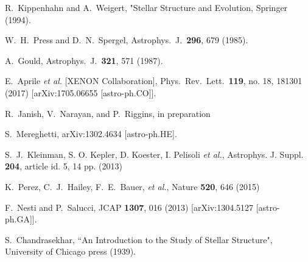 R.~Kippenhahn and A.~Weigert, "Stellar Structure and Evolution, Springer (1994).

  W.~H.~Press and D.~N.~Spergel,
  Astrophys.\ J.\  {\bf 296}, 679 (1985).


  A.~Gould,
  Astrophys.\ J.\  {\bf 321}, 571 (1987).


  E.~Aprile {\it et al.} [XENON Collaboration],
  Phys.\ Rev.\ Lett.\  {\bf 119}, no. 18, 181301 (2017)
  [arXiv:1705.06655 [astro-ph.CO]].

R.~Janish, V.~Narayan, and P.~Riggins, in preparation

  S.~Mereghetti,
  arXiv:1302.4634 [astro-ph.HE].


S.~J.~Kleinman, S. O. Kepler, D. Koester, I. Pelisoli  {\it et al.}, Astrophys. J. Suppl. {\bf 204}, article
id. 5, 14 pp. (2013)

K.~Perez, C.~J.~Hailey, F.~E.~Bauer, {\it et al.}, Nature {\bf 520}, 646 (2015)

  F.~Nesti and P.~Salucci,
  JCAP {\bf 1307}, 016 (2013)
  [arXiv:1304.5127 [astro-ph.GA]].


S.~Chandrasekhar, ``An Introduction to the Study of Stellar Structure", University of Chicago press (1939).

